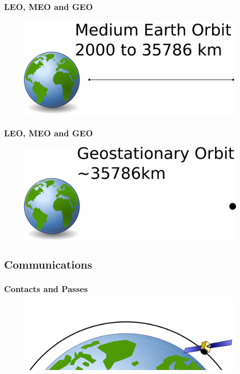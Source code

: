 \documentclass[12pt,utf8,notheorems,compress]{beamer}
\begin{document}
\begin{frame}
  \frametitle{LEO, MEO and GEO}
  \begin{figure}[!ht]
    \centering
    \includegraphics[width=\textwidth]{orbit3.png}
  \end{figure}
\end{frame}

\begin{frame}
  \frametitle{LEO, MEO and GEO}
  \begin{figure}[!ht]
    \centering
    \includegraphics[width=\textwidth]{orbit4.png}
  \end{figure}
\end{frame}

\subsection{Communications}

\begin{frame}
  \frametitle{Contacts and Passes}
  \pause
  \begin{figure}[!ht]
    \centering
    \includegraphics[width=\textwidth]{pass1.png}
  \end{figure}
\end{frame}
\end{document}
